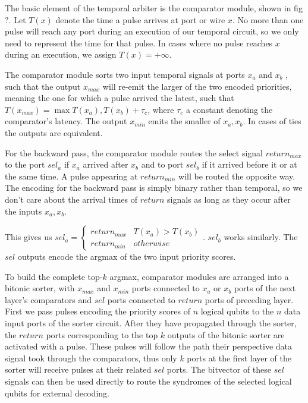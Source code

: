 \documentclass[conference]{IEEEtran}
\begin{document}
The basic element of the temporal arbiter is the comparator
module, shown in fig$?$. Let $T(x)$ denote the time a pulse
arrives at port or wire $x$. No more than one pulse will
reach any port during an execution of our temporal circuit,
so we only need to represent the time for that pulse. In
cases where no pulse reaches $x$ during an execution, we
assign $T(x) = +\infty$.

The comparator module sorts two input temporal signals at
ports $x_a$ and $x_b$ , such that the output $x_{max}$ will
re-emit the larger of the two encoded priorities, meaning
the one for which a pulse arrived the latest, such that
$T(x_{max}) = \max{T(x_a), T(x_b)} + \tau_c$, where $\tau_c$
a constant denoting the comparator's latency. The output
$x_{min}$ emits the smaller of $x_a, x_b$. In cases of ties
the outputs are equivalent.

For the backward pass, the comparator module routes the
select signal $return_{max}$ to the port $sel_{a}$ if $x_a$
arrived after $x_b$ and to port $sel_{b}$ if it arrived
before it or at the same time. A pulse appearing at
$return_{min}$ will be routed the opposite way. The encoding
for the backward pass is simply binary rather than temporal,
so we don't care about the arrival times of $return$ signals
as long as they occur after the inputs $x_a, x_b$. 

This gives us $sel_a = \begin{cases} return_{max} &
T(x_a)>T(x_b) \\ return_{min} & otherwise \end{cases}$.
$sel_b$ works similarly. The $sel$ outputs encode the argmax
of the two input priority scores. 

To build the complete top-$k$ argmax, comparator modules are
arranged into a bitonic sorter, with $x_{max}$ and $x_{min}$
ports connected to $x_a$ or $x_b$ ports of the next layer's
comparators and $sel$ ports connected to $return$ ports of
preceding layer. First we pass pulses encoding the priority
scores of $n$ logical qubits to the $n$ data input ports of
the sorter circuit. After they have propagated through the
sorter, the $return$ ports corresponding to the top $k$
outputs of the bitonic sorter are activated with a pulse.
These pulses will follow the path their perspective data
signal took through the comparators, thus only $k$ ports at
the first layer of the sorter will receive pulses at their
related $sel$ ports. The bitvector of these $sel$ signals
can then be used directly to route the syndromes of the
selected logical qubits for external decoding.
\end{document}
